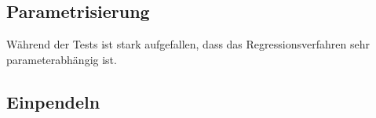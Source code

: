 \subsection{Parametrisierung}
Während der Tests ist stark aufgefallen, dass das Regressionsverfahren sehr parameterabhängig ist.

\subsection{Einpendeln}
\label{sec_pendel}